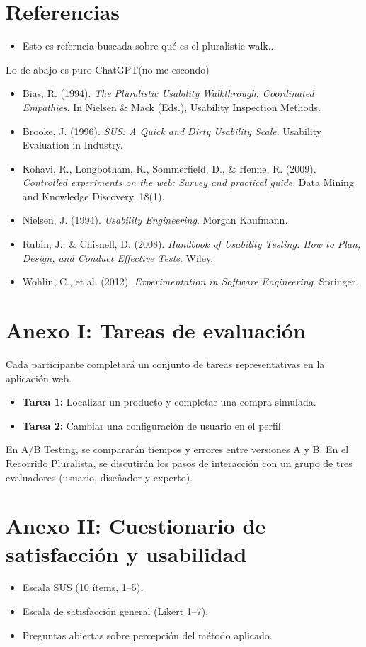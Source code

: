 \documentclass[a4paper,12pt]{report}
\begin{document}
\chapter*{Referencias}
\begin{itemize}
	\item Esto es referncia buscada sobre qué es el pluralistic walk...\cite{PluralisticWalkthrough}
\end{itemize}


Lo de abajo es puro ChatGPT(no me escondo)
\begin{itemize}
    \item Bias, R. (1994). \textit{The Pluralistic Usability Walkthrough: Coordinated Empathies}. In Nielsen \& Mack (Eds.), Usability Inspection Methods.
    \item Brooke, J. (1996). \textit{SUS: A Quick and Dirty Usability Scale}. Usability Evaluation in Industry.
    \item Kohavi, R., Longbotham, R., Sommerfield, D., \& Henne, R. (2009). \textit{Controlled experiments on the web: Survey and practical guide}. Data Mining and Knowledge Discovery, 18(1).
    \item Nielsen, J. (1994). \textit{Usability Engineering}. Morgan Kaufmann.
    \item Rubin, J., \& Chisnell, D. (2008). \textit{Handbook of Usability Testing: How to Plan, Design, and Conduct Effective Tests}. Wiley.
    \item Wohlin, C., et al. (2012). \textit{Experimentation in Software Engineering}. Springer.
\end{itemize}

\cleardoublepage

\printbibliography[heading=bibintoc,title={Bibliografía}]
\appendix

\chapter{Anexo I: Tareas de evaluación}
Cada participante completará un conjunto de tareas representativas en la aplicación web.  
\begin{itemize}
    \item \textbf{Tarea 1:} Localizar un producto y completar una compra simulada.  
    \item \textbf{Tarea 2:} Cambiar una configuración de usuario en el perfil.  
\end{itemize}
En A/B Testing, se compararán tiempos y errores entre versiones A y B.  
En el Recorrido Pluralista, se discutirán los pasos de interacción con un grupo de tres evaluadores (usuario, diseñador y experto).

\chapter{Anexo II: Cuestionario de satisfacción y usabilidad}
\begin{itemize}
    \item Escala SUS (10 ítems, 1--5).  
    \item Escala de satisfacción general (Likert 1--7).  
    \item Preguntas abiertas sobre percepción del método aplicado.  
\end{itemize}
\end{document}

